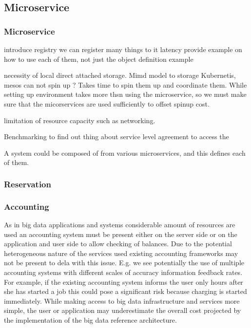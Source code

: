 \documentclass[10pt]{article}
\begin{document}
\subsection{Microservice}

\subsubsection{Microservice}

 
introduce registry we can register many things to it 
latency 
provide example on how to use each of them, not just the object definition example 
 
necessity of local direct attached storage. 
Mimd model to storage  
Kubernetis, mesos can not spin up ?  
Takes time to spin them up and coordinate them. While setting up environment takes more thsn using the microservice, so we must make sure that the micorservices are used sufficiently to offset spinup cost. 
 
limitation of resource capacity such as networking. 
 
Benchmarking to find out thing about service level agreement to access
the 


A system could be composed of from various microservices, and this defines
each of them.



\subsubsection{Reservation}


 
\subsubsection{Accounting}


As in big data applications and systems considerable amount of
resources are used an accounting system must be present either on the
server side or on the application and user side to allow checking of
balances. Due to the potential heterogeneous nature of the services
used existing accounting frameworks may not be present to dela with
this issue. E.g. we see potentially the use of multiple accounting
systems with different scales of accuracy information feedback
rates. For example, if the existing accounting system informs the user
only hours after she has started a job this could pose a significant
risk because charging is started immediately. While making access to
big data infrastructure and services more simple, the user or
application may underestimate the overall cost projected by the
implementation of the big data reference architecture.
\end{document}
